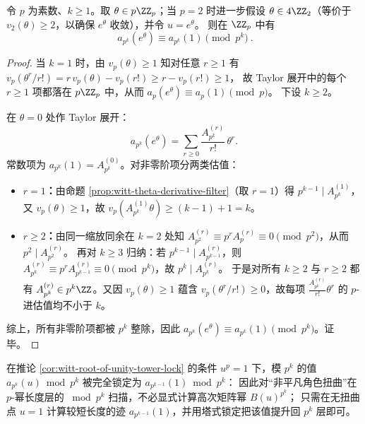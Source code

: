 \begin{corollary}[\texorpdfstring{$p$}{p}-进平坦球：\texorpdfstring{$u=e^\theta$}{u=exp(theta)} 在 \texorpdfstring{$u=1$}{u=1} 附近的 \texorpdfstring{$p^k$}{p^k}-不敏感性]\label{cor:witt-padic-flatness-ball}
令 \(p\) 为素数、\(k\ge 1\)。取 \(\theta\in p\ZZ_p\)；当 \(p=2\) 时进一步假设 \(\theta\in 4\ZZ_2\)（等价于 \(v_2(\theta)\ge 2\)，以确保 \(e^\theta\) 收敛），并令 \(u=e^\theta\)。
则在 \(\ZZ_p\) 中有
\[
\boxed{\ a_{p^k}(e^\theta)\equiv a_{p^k}(1)\pmod{p^k}\ }.
\]
\end{corollary}
\begin{proof}
当 \(k=1\) 时，由 \(v_p(\theta)\ge 1\) 知对任意 \(r\ge 1\) 有
\(
v_p(\theta^r/r!)=r\,v_p(\theta)-v_p(r!)\ge r-v_p(r!)\ge 1
\)，
故 Taylor 展开中的每个 \(r\ge 1\) 项都落在 \(p\ZZ_p\) 中，从而
\(
a_p(e^\theta)\equiv a_p(1)\pmod p
\)。
下设 \(k\ge 2\)。

在 \(\theta=0\) 处作 Taylor 展开：
\[
a_{p^k}(e^\theta)=\sum_{r\ge 0}\frac{A_{p^k}^{(r)}}{r!}\,\theta^r.
\]
常数项为 \(a_{p^k}(1)=A_{p^k}^{(0)}\)。对非零阶项分两类估值：
\begin{itemize}
  \item \textbf{\(r=1\)：}由命题 \ref{prop:witt-theta-derivative-filter}（取 \(r=1\)）得 \(p^{k-1}\mid A_{p^k}^{(1)}\)，又 \(v_p(\theta)\ge 1\)，故
  \(v_p(A_{p^k}^{(1)}\theta)\ge (k-1)+1=k\)。
  \item \textbf{\(r\ge 2\)：}由同一缩放同余在 \(k=2\) 处知
  \(A_{p^2}^{(r)}\equiv p^rA_{p}^{(r)}\equiv 0\pmod{p^2}\)，从而 \(p^2\mid A_{p^2}^{(r)}\)。
  再对 \(k\ge 3\) 归纳：若 \(p^{k-1}\mid A_{p^{k-1}}^{(r)}\)，则
  \(A_{p^k}^{(r)}\equiv p^rA_{p^{k-1}}^{(r)}\equiv 0\pmod{p^k}\)，故 \(p^k\mid A_{p^k}^{(r)}\)。
  于是对所有 \(k\ge 2\) 与 \(r\ge 2\) 都有 \(A_{p^k}^{(r)}\in p^k\ZZ\)。又因 \(v_p(\theta)\ge 1\) 蕴含 \(v_p(\theta^r/r!)\ge 0\)，故每项 \(\frac{A_{p^k}^{(r)}}{r!}\theta^r\) 的 \(p\)-进估值均不小于 \(k\)。
\end{itemize}
综上，所有非零阶项都被 \(p^k\) 整除，因此 \(a_{p^k}(e^\theta)\equiv a_{p^k}(1)\pmod{p^k}\)。证毕。
\end{proof}

\begin{remark}\label{rem:witt-root-of-unity-acceleration}
在推论 \ref{cor:witt-root-of-unity-tower-lock} 的条件 \(u^p=1\) 下，模 \(p^k\) 的值
\(
a_{p^k}(u)\bmod p^k
\)
被完全锁定为
\(
a_{p^{k-1}}(1)\bmod p^k
\)：
因此对“非平凡角色扭曲”在 \(p\)-幂长度层的 \(\bmod p^k\) 扫描，不必显式计算高次矩阵幂
\(
B(u)^{p^k}
\)；
只需在无扭曲点 \(u=1\) 计算较短长度的迹 \(a_{p^{k-1}}(1)\)，并用塔式锁定把该值提升回 \(p^k\) 层即可。
\end{remark}

